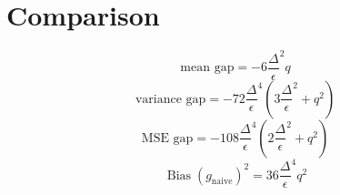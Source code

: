 \documentclass{article}
\begin{document}
\section*{Comparison}
\begin{dmath*}
\text{mean gap} = - 6 {\frac{\Delta}{\epsilon}}^{2} q
\end{dmath*}
\begin{dmath*}
\text{variance gap} = - 72 {\frac{\Delta}{\epsilon}}^{4} \left(3 {\frac{\Delta}{\epsilon}}^{2} + q^{2}\right)
\end{dmath*}
\begin{dmath*}
\text{MSE gap} = - 108 {\frac{\Delta}{\epsilon}}^{4} \left(2 {\frac{\Delta}{\epsilon}}^{2} + q^{2}\right)
\end{dmath*}
\begin{dmath*}
\operatorname{Bias}(g_{\mathrm{naive}})^2 = 36 {\frac{\Delta}{\epsilon}}^{4} q^{2}
\end{dmath*}
\end{document}
